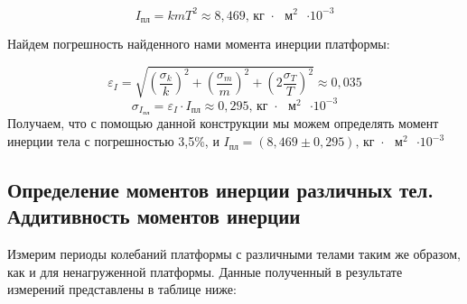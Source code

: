 \documentclass[a4paper,14pt]{extarticle}
\begin{document}
	\begin{equation}
		I_\text{пл} = kmT^2 \approx 8,469  \text{,  кг $\cdot$ $\text{м}^2$ $\cdot 10^{-3}$}  
	\end{equation}
	
	Найдем погрешность найденного нами момента инерции платформы:
	
	\begin{equation}
		\varepsilon_I = \sqrt{ \left(\frac{\sigma_k}{k}\right)^2 +\left(\frac{\sigma_m}{m}\right)^2 + \left(2\frac{\sigma_T}{T}\right)^2} \approx 0,035
	\end{equation}
	\begin{equation}
		\sigma_{I_\text{пл}} = \varepsilon_I \cdot I_\text{пл} \approx 0,295 \text{,  кг $\cdot$ $\text{м}^2$ $\cdot 10^{-3}$}
	\end{equation}
	Получаем, что с помощью данной конструкции мы можем определять момент инерции тела с погрешностью 3,5\%, и $I_\text{пл} = \left(8,469 \pm 0,295\right) \text{,  кг $\cdot$ $\text{м}^2$ $\cdot 10^{-3}$}$
	
	\subsection{Определение моментов инерции различных тел. Аддитивность моментов инерции}
	
	Измерим периоды колебаний платформы с различными телами таким же образом, как и для ненагруженной платформы. Данные полученный в результате измерений представлены в таблице ниже:
	
\end{document}
